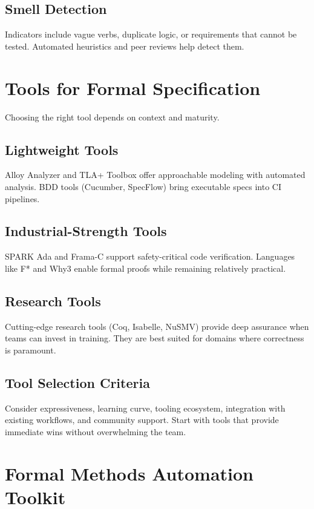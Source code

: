 \subsection{Smell Detection}
Indicators include vague verbs, duplicate logic, or requirements that cannot be tested. Automated heuristics and peer reviews help detect them.

\section{Tools for Formal Specification}
\label{sec:formal-tools}

Choosing the right tool depends on context and maturity.

\subsection{Lightweight Tools}
Alloy Analyzer and TLA+ Toolbox offer approachable modeling with automated analysis. BDD tools (Cucumber, SpecFlow) bring executable specs into CI pipelines.

\subsection{Industrial-Strength Tools}
SPARK Ada and Frama-C support safety-critical code verification. Languages like F* and Why3 enable formal proofs while remaining relatively practical.

\subsection{Research Tools}
Cutting-edge research tools (Coq, Isabelle, NuSMV) provide deep assurance when teams can invest in training. They are best suited for domains where correctness is paramount.

\subsection{Tool Selection Criteria}
Consider expressiveness, learning curve, tooling ecosystem, integration with existing workflows, and community support. Start with tools that provide immediate wins without overwhelming the team.

\section{Formal Methods Automation Toolkit}
\label{sec:formal-automation}

